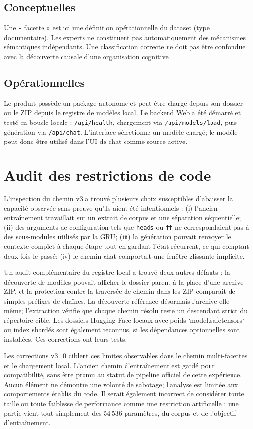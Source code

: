 \documentclass[11pt,a4paper]{article}
\begin{document}
\subsection{Conceptuelles}
Une « facette » est ici une définition opérationnelle du dataset (type documentaire). Les experts ne constituent pas automatiquement des mécanismes sémantiques indépendants. Une classification correcte ne doit pas être confondue avec la découverte causale d'une organisation cognitive.
\subsection{Opérationnelles}
Le produit possède un package autonome et peut être chargé depuis son dossier ou le ZIP depuis le registre de modèles local. Le backend Web a été démarré et testé en boucle locale : \texttt{/api/health}, chargement via \texttt{/api/models/load}, puis génération via \texttt{/api/chat}. L'interface sélectionne un modèle chargé; le modèle peut donc être utilisé dans l'UI de chat comme source active.

\section{Audit des restrictions de code}
L'inspection du chemin v3 a trouvé plusieurs choix susceptibles d'abaisser la capacité observée sans preuve qu'ils aient été intentionnels : (i) l'ancien entraînement travaillait sur un extrait de corpus et une séparation séquentielle; (ii) des arguments de configuration tels que \texttt{heads} ou \texttt{ff} ne correspondaient pas à des sous-modules utilisés par la GRU; (iii) la génération pouvait renvoyer le contexte complet à chaque étape tout en gardant l'état récurrent, ce qui comptait deux fois le passé; (iv) le chemin chat comportait une fenêtre glissante implicite.

Un audit complémentaire du registre local a trouvé deux autres défauts : la découverte de modèles pouvait afficher le dossier parent à la place d'une archive ZIP, et la protection contre la traversée de chemin dans les ZIP comparait de simples préfixes de chaînes. La découverte référence désormais l'archive elle-même; l'extraction vérifie que chaque chemin résolu reste un descendant strict du répertoire cible. Les dossiers Hugging Face locaux avec poids `model.safetensors` ou index shardés sont également reconnus, si les dépendances optionnelles sont installées. Ces corrections ont leurs tests.

Les corrections v3\_0 ciblent ces limites observables dans le chemin multi-facettes et le chargement local. L'ancien chemin d'entraînement est gardé pour compatibilité, sans être promu au statut de pipeline officiel de cette expérience. Aucun élément ne démontre une volonté de sabotage; l'analyse est limitée aux comportements établis du code. Il serait également incorrect de considérer toute taille ou toute faiblesse de performance comme une restriction artificielle : une partie vient tout simplement des 54\,536 paramètres, du corpus et de l'objectif d'entraînement.
\end{document}
